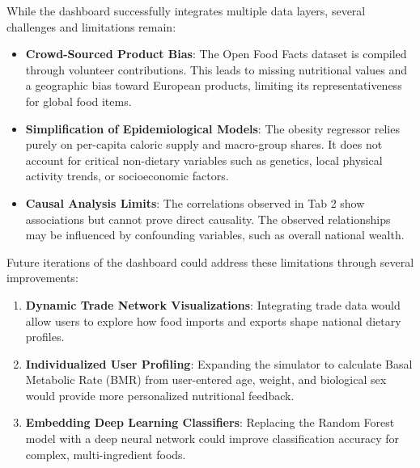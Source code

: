 \documentclass[10pt, a4paper]{article}
\begin{document}
While the dashboard successfully integrates multiple data layers, several challenges and limitations remain:
\begin{itemize}[nosep, leftmargin=1.5em]
    \item \textbf{Crowd-Sourced Product Bias}: The Open Food Facts dataset is compiled through volunteer contributions. This leads to missing nutritional values and a geographic bias toward European products, limiting its representativeness for global food items.
    \item \textbf{Simplification of Epidemiological Models}: The obesity regressor relies purely on per-capita caloric supply and macro-group shares. It does not account for critical non-dietary variables such as genetics, local physical activity trends, or socioeconomic factors.
    \item \textbf{Causal Analysis Limits}: The correlations observed in Tab 2 show associations but cannot prove direct causality. The observed relationships may be influenced by confounding variables, such as overall national wealth.
\end{itemize}

Future iterations of the dashboard could address these limitations through several improvements:
\begin{enumerate}[nosep, leftmargin=1.5em]
    \item \textbf{Dynamic Trade Network Visualizations}: Integrating trade data would allow users to explore how food imports and exports shape national dietary profiles.
    \item \textbf{Individualized User Profiling}: Expanding the simulator to calculate Basal Metabolic Rate (BMR) from user-entered age, weight, and biological sex would provide more personalized nutritional feedback.
    \item \textbf{Embedding Deep Learning Classifiers}: Replacing the Random Forest model with a deep neural network could improve classification accuracy for complex, multi-ingredient foods.
\end{enumerate}
\end{document}
